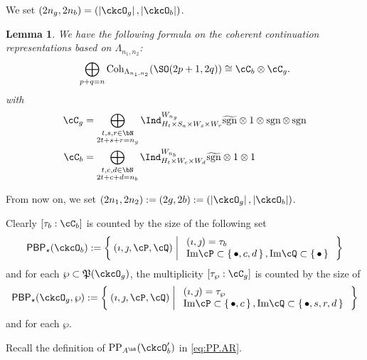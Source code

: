 \documentclass[12pt,a4paper]{amsart}
\def\Im{\operatorname{Im}}
\def\abs#1{\left|{#1}\right|}
\newcommand{\sgn}{\operatorname{sgn}}
\numberwithin{equation}{section}
\newtheorem{lem}[thm]{Lemma}
\theoremstyle{remark}
\def\Cint#1{\Coh_{[#1]}}
\def\PP{\mathrm{PP}}
\def\Im{\mathrm{Im}}
\def\Coh{\mathrm{Coh}}
\def\CPP{\mathfrak{P}}
\def\hsgn{\widetilde{\mathrm{sgn}}}
\def\PBP{\mathsf{PBP}}
\def\sP{\wp}
\begin{document}
We set $(2n_{g},2n_{b}) = (\abs{\ckcO_g},\abs{\ckcO_b})$.

\begin{lem}
  We have the following formula on the coherent continuation
  representations based on $\Lambda_{n_{1},n_{2}}$:
  \[
    \bigoplus_{p+q=n} \Coh_{\Lambda_{n_1, n_2}}(\SO(2p+1,2q)) \cong \cC_{b}\otimes \cC_{g}.
  \]
  with
  \[
    \begin{split}
      \cC_g %
      &=\bigoplus_{\substack{t,s,r\in\bN\\2t+s+r=n_{g}}} \Ind_{H_{t} \times S_{a}\times W_s\times W_r}^{W_{n_{g}}}
      \hsgn \otimes 1 \otimes \sgn \otimes \sgn \\
      \cC_b & =
      \bigoplus_{\substack{t,c,d\in \bN\\2t+c+d=n_{b}}}
      \Ind_{H_{t}\times W_{c}\times W_{d}}^{W_{n_{b}}} \hsgn\otimes 1\otimes 1
    \end{split}
  \]
\end{lem}


From now on, we set $ (2n_{1},2n_{2}) := (2g,2b) :=(\abs{\ckcO_g},\abs{\ckcO_b})$.

Clearly $[\tau_{b}:\cC_{b}]$ is counted by the size of the following set
\[
  \PBP_{\star}(\ckcO_b) := \Set{(\imath,\jmath,\cP,\cQ)| %
    \begin{array}{l}
      (\imath,\jmath) = \tau_{b}\\
      \Im \cP \subset \set{\bullet,c,d}, \Im \cQ \subset\set{\bullet}\\
    \end{array}
  }
\]
and for each $\sP\subset \CPP(\ckcO_{g})$, the multiplicity
$[\tau_{\sP}: \cC_{g}]$ is counted by the size of
\[
  \PBP_{\star}(\ckcO_g,\sP):= \Set{(\imath,\jmath,\cP,\cQ)| %
    \begin{array}{l}
      (\imath,\jmath) = \tau_{\sP}\\
      \Im \cP \subset \set{\bullet,c}, \Im \cQ \subset\set{\bullet, s,r,d}\\
    \end{array}
  }
\]
and for each $\sP$.

Recall the definition of $\PP_{A^{\bR}}(\ckcO'_{b})$ in  \eqref{eq:PP.AR}.
\end{document}

